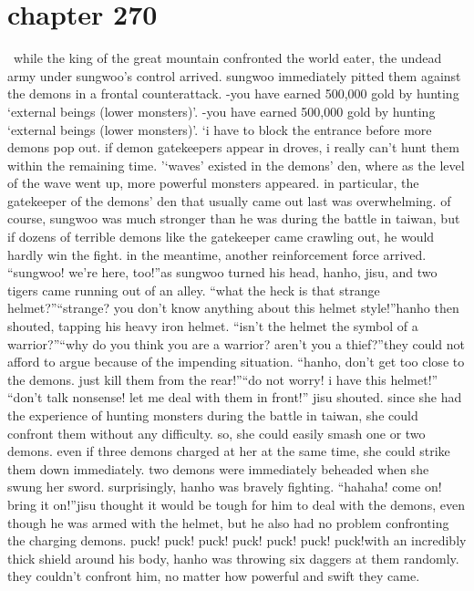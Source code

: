 \section{chapter 270}






 while the king of the great mountain confronted the world eater, the undead army under sungwoo’s control arrived.
 sungwoo immediately pitted them against the demons in a frontal counterattack.
-you have earned 500,000 gold by hunting ‘external beings (lower monsters)’.
-you have earned 500,000 gold by hunting ‘external beings (lower monsters)’.
‘i have to block the entrance before more demons pop out.
 if demon gatekeepers appear in droves, i really can’t hunt them within the remaining time.
’‘waves’ existed in the demons’ den, where as the level of the wave went up, more powerful monsters appeared.
 in particular, the gatekeeper of the demons’ den that usually came out last was overwhelming.
of course, sungwoo was much stronger than he was during the battle in taiwan, but if dozens of terrible demons like the gatekeeper came crawling out, he would hardly win the fight.
 in the meantime, another reinforcement force arrived.
“sungwoo! we’re here, too!”as sungwoo turned his head, hanho, jisu, and two tigers came running out of an alley.
“what the heck is that strange helmet?”“strange? you don’t know anything about this helmet style!”hanho then shouted, tapping his heavy iron helmet.
“isn’t the helmet the symbol of a warrior?”“why do you think you are a warrior? aren’t you a thief?”they could not afford to argue because of the impending situation.
“hanho, don’t get too close to the demons.
 just kill them from the rear!”“do not worry! i have this helmet!”
“don’t talk nonsense! let me deal with them in front!” jisu shouted.
since she had the experience of hunting monsters during the battle in taiwan, she could confront them without any difficulty.
so, she could easily smash one or two demons.
 even if three demons charged at her at the same time, she could strike them down immediately.
two demons were immediately beheaded when she swung her sword.
surprisingly, hanho was bravely fighting.
“hahaha! come on! bring it on!”jisu thought it would be tough for him to deal with the demons, even though he was armed with the helmet, but he also had no problem confronting the charging demons.
puck! puck! puck! puck! puck! puck! puck!with an incredibly thick shield around his body, hanho was throwing six daggers at them randomly.
 they couldn’t confront him, no matter how powerful and swift they came.
